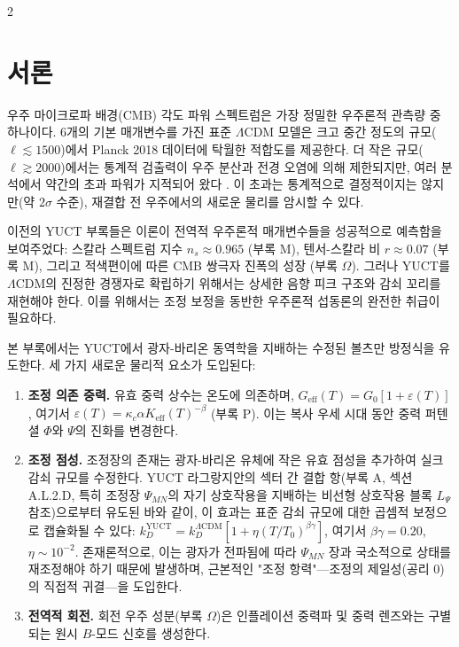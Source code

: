 \documentclass[11pt,a4paper]{article}
\begin{document}
	\vspace{0.4cm}
	
	\begin{multicols}{2}
		
		\section{서론}
		
		우주 마이크로파 배경(CMB) 각도 파워 스펙트럼은 가장 정밀한 우주론적 관측량 중 하나이다. 6개의 기본 매개변수를 가진 표준 $\Lambda$CDM 모델은 크고 중간 정도의 규모($\ell \lesssim 1500$)에서 Planck 2018 데이터에 탁월한 적합도를 제공한다. 더 작은 규모($\ell \gtrsim 2000$)에서는 통계적 검출력이 우주 분산과 전경 오염에 의해 제한되지만, 여러 분석에서 약간의 초과 파워가 지적되어 왔다 \cite{Planck2018}. 이 초과는 통계적으로 결정적이지는 않지만(약 $2\sigma$ 수준), 재결합 전 우주에서의 새로운 물리를 암시할 수 있다.
		
		이전의 YUCT 부록들은 이론이 전역적 우주론적 매개변수들을 성공적으로 예측함을 보여주었다: 스칼라 스펙트럼 지수 $n_s \approx 0.965$ (부록 M), 텐서-스칼라 비 $r \approx 0.07$ (부록 M), 그리고 적색편이에 따른 CMB 쌍극자 진폭의 성장 (부록 $\Omega$). 그러나 YUCT를 $\Lambda$CDM의 진정한 경쟁자로 확립하기 위해서는 상세한 음향 피크 구조와 감쇠 꼬리를 재현해야 한다. 이를 위해서는 조정 보정을 동반한 우주론적 섭동론의 완전한 취급이 필요하다.
		
		본 부록에서는 YUCT에서 광자-바리온 동역학을 지배하는 수정된 볼츠만 방정식을 유도한다. 세 가지 새로운 물리적 요소가 도입된다:
		\begin{enumerate}
			\item \textbf{조정 의존 중력.} 유효 중력 상수는 온도에 의존하며, $G_{\mathrm{eff}}(T) = G_0[1 + \varepsilon(T)]$, 여기서 $\varepsilon(T) = \kappa_c \alpha K_{\mathrm{eff}}(T)^{-\beta}$ (부록 P). 이는 복사 우세 시대 동안 중력 퍼텐셜 $\Phi$와 $\Psi$의 진화를 변경한다.
			\item \textbf{조정 점성.} 조정장의 존재는 광자-바리온 유체에 작은 유효 점성을 추가하여 실크 감쇠 규모를 수정한다. YUCT 라그랑지안의 섹터 간 결합 항(부록 A, 섹션 A.L.2.D, 특히 조정장 $\Psi_{MN}$의 자기 상호작용을 지배하는 비선형 상호작용 블록 $L_{\Psi}$ 참조)으로부터 유도된 바와 같이, 이 효과는 표준 감쇠 규모에 대한 곱셈적 보정으로 캡슐화될 수 있다: $k_D^{\text{YUCT}} = k_D^{\Lambda\text{CDM}} [1 + \eta (T/T_0)^{\beta\gamma}]$, 여기서 $\beta\gamma = 0.20$, $\eta \sim 10^{-2}$. 존재론적으로, 이는 광자가 전파됨에 따라 $\Psi_{MN}$ 장과 국소적으로 상태를 재조정해야 하기 때문에 발생하며, 근본적인 "조정 항력"—조정의 제일성(공리 0)의 직접적 귀결—을 도입한다.
			\item \textbf{전역적 회전.} 회전 우주 성분(부록 $\Omega$)은 인플레이션 중력파 및 중력 렌즈와는 구별되는 원시 $B$-모드 신호를 생성한다.
		\end{enumerate}
		

\end{multicols}
\end{document}
